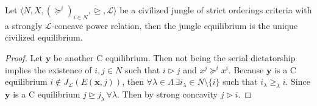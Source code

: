 \begin{proposition}
    Let $\langle N,X,(\succeq^i)_{i\in N}, \trianglerighteq, \mathcal{L}\rangle$ be a civilized jungle of strict orderings criteria with a strongly $\mathcal{L}$-concave power relation, then the jungle equilibrium is the unique civilized equilibrium.

    \begin{proof}
        Let $\textbf{y}$ be another C equilibrium. Then not being the serial dictatorship implies the existence of $i,j\in N$ such that $i\triangleright j$ and $x^j\succeq^ix^i$. Because $\textbf{y}$ is a C equilibrium $i\notin J_{\mathcal{L}}(E(\textbf{x},j))$, then $\forall\lambda\in\Lambda\,\exists i_{\lambda}\in N\setminus\{i\}$ such that $i_{\lambda}\geq_{\lambda}i$. Since $\textbf{y}$ is a C equilibrium $j\trianglerighteq j_{\lambda}\,\forall\lambda$. Then by strong concavity $j\triangleright i$.  
    \end{proof}
\end{proposition}

\newpage



